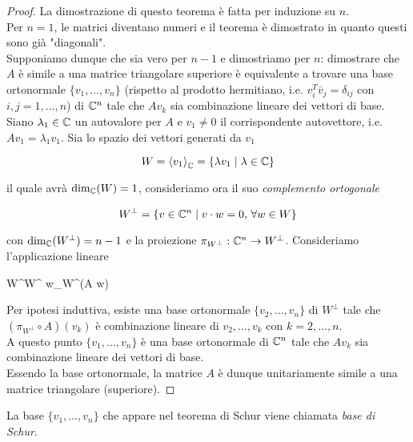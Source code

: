 \begin{proof}
	La dimostrazione di questo teorema è fatta per induzione su $ n $.\\
	Per $ n=1 $, le matrici diventano numeri e il teorema è dimostrato in quanto questi sono già "diagonali".\\
	Supponiamo dunque che sia vero per $ n-1 $ e dimostriamo per $ n $: dimostrare che $ A $ è simile a una matrice triangolare superiore è equivalente a trovare una base ortonormale $ \{v_{1},\dots,v_{n}\} $ (rispetto al prodotto hermitiano, i.e. $ v_{i}^{T} \bar{v}_{j} = \delta_{ij} $ con $ i,j=1,\dots,n $) di $ \mathbb{C}^{n} $ tale che $ A v_{k} $ sia combinazione lineare dei vettori di base.\\
	Siano $ \lambda_{1} \in \mathbb{C} $ un autovalore per $ A $ e $ v_{1} \neq 0 $ il corrispondente autovettore, i.e. $ A v_{1} = \lambda_{1} v_{1} $. Sia lo spazio dei vettori generati da $ v_{1} $
	
	\begin{equation}
		W = \ev{v_{1}}_{\C} = \{ \lambda v_{1} \mid \lambda \in \C \}
	\end{equation}
	
	il quale avrà $ \dim_{\mathbb{C}}(W) = 1 $, consideriamo ora il suo \textit{complemento ortogonale}
	
	\begin{equation}
		W^{\perp} = \{ v\in \mathbb{C}^{n} \mid v \cdot w = 0, \, \forall w \in W \}
	\end{equation}

	con $ \dim_{\mathbb{C}}(W^{\perp}) = n-1 $ e la proiezione $ \pi_{W^{\perp}} : \mathbb{C}^{n} \to W^{\perp} $. Consideriamo l'applicazione lineare
	
		{W^{\perp}}{W^{\perp}}
		{w}{\pi_{W^{\perp}}(A w)}
	
	Per ipotesi induttiva, esiste una base ortonormale $ \{v_{2},\dots,v_{n}\} $ di $ W^{\perp} $ tale che $ (\pi_{W^{\perp}} \circ A)(v_{k}) $ è combinazione lineare di $ v_{2},\dots,v_{k} $ con $ k=2,\dots,n $.\\
	A questo punto $ \{v_{1},\dots,v_{n}\} $ è una base ortonormale di $ \mathbb{C}^{n} $ tale che $ A v_{k} $ sia combinazione lineare dei vettori di base.\\
	Essendo la base ortonormale, la matrice $ A $ è dunque unitariamente simile a una matrice triangolare (superiore).
\end{proof}

\begin{remark}
	La base $ \{v_{1},\dots,v_{n}\} $ che appare nel teorema di Schur viene chiamata \textit{base di Schur}.
\end{remark}

